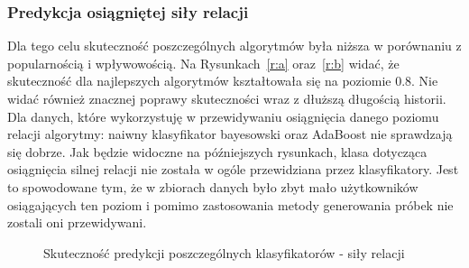 \documentclass[polish,12pt]{aghthesis}
\begin{document}
\subsubsection{Predykcja osiągniętej siły relacji}

Dla tego celu skuteczność poszczególnych algorytmów była niższa w porównaniu z popularnością i wpływowością. Na Rysunkach~\ref{r:a} oraz~\ref{r:b} widać, że skuteczność dla najlepszych algorytmów kształtowała się na poziomie 0.8. Nie widać również znacznej poprawy skuteczności wraz z dłuższą długością historii. Dla danych, które wykorzystuję w przewidywaniu osiągnięcia danego poziomu relacji algorytmy: naiwny klasyfikator bayesowski oraz AdaBoost nie sprawdzają się dobrze. Jak będzie widoczne na późniejszych rysunkach, klasa dotycząca osiągnięcia silnej relacji nie została w ogóle przewidziana przez klasyfikatory. Jest to spowodowane tym, że w zbiorach danych było zbyt mało użytkowników osiągających ten poziom i pomimo zastosowania metody generowania próbek nie zostali oni przewidywani.

\begin{figure}[htp] 
    \centering
    \hfill%
    \caption{Skuteczność predykcji poszczególnych klasyfikatorów - siły relacji}
\end{figure}
\FloatBarrier
\end{document}

